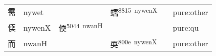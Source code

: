 \documentclass[14pt,a4paper]{scrartcl}
\begin{document}
\begin{longtable}[c]{@{}llllll@{}}
\begin{minipage}[t]{0.14\columnwidth}
需
\strut\end{minipage} &
\begin{minipage}[t]{0.14\columnwidth}\raggedright\strut
nywet
\strut\end{minipage} &
\begin{minipage}[t]{0.14\columnwidth}\raggedright\strut
\strut\end{minipage} &
\begin{minipage}[t]{0.14\columnwidth}\raggedright\strut
蠕\textsuperscript{8815~nywenX}
\strut\end{minipage} &
\begin{minipage}[t]{0.14\columnwidth}\raggedright\strut
\strut\end{minipage} &
\begin{minipage}[t]{0.14\columnwidth}\raggedright\strut
pure:other
\strut\end{minipage}\tabularnewline
\begin{minipage}[t]{0.14\columnwidth}\raggedright\strut
偄
\strut\end{minipage} &
\begin{minipage}[t]{0.14\columnwidth}\raggedright\strut
nywenX
\strut\end{minipage} &
\begin{minipage}[t]{0.14\columnwidth}\raggedright\strut
偄\textsuperscript{5044~nwanH}
\strut\end{minipage} &
\begin{minipage}[t]{0.14\columnwidth}\raggedright\strut
\strut\end{minipage} &
\begin{minipage}[t]{0.14\columnwidth}\raggedright\strut
\strut\end{minipage} &
\begin{minipage}[t]{0.14\columnwidth}\raggedright\strut
pure:qu
\strut\end{minipage}\tabularnewline
\begin{minipage}[t]{0.14\columnwidth}\raggedright\strut
而
\strut\end{minipage} &
\begin{minipage}[t]{0.14\columnwidth}\raggedright\strut
nwanH
\strut\end{minipage} &
\begin{minipage}[t]{0.14\columnwidth}\raggedright\strut
\strut\end{minipage} &
\begin{minipage}[t]{0.14\columnwidth}\raggedright\strut
耎\textsuperscript{800e~nywenX}
\strut\end{minipage} &
\begin{minipage}[t]{0.14\columnwidth}\raggedright\strut
\strut\end{minipage} &
\begin{minipage}[t]{0.14\columnwidth}\raggedright\strut
pure:other
\strut\end{minipage}\tabularnewline
\bottomrule
\end{longtable}
\end{document}
